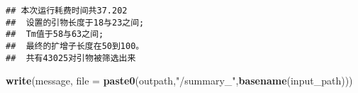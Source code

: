 \documentclass[
]{article}
\newenvironment{Shaded}{\begin{snugshade}}{\end{snugshade}}
\newcommand{\AttributeTok}[1]{\textcolor[rgb]{0.13,0.29,0.53}{#1}}
\newcommand{\FunctionTok}[1]{\textcolor[rgb]{0.13,0.29,0.53}{\textbf{#1}}}
\newcommand{\NormalTok}[1]{#1}
\newcommand{\StringTok}[1]{\textcolor[rgb]{0.31,0.60,0.02}{#1}}
\begin{document}
\begin{verbatim}
## 本次运行耗费时间共37.202
##  设置的引物长度于18与23之间;
##  Tm值于58与63之间;
##  最终的扩增子长度在50到100。
##  共有43025对引物被筛选出来
\end{verbatim}

\begin{Shaded}
\begin{Highlighting}[]
\FunctionTok{write}\NormalTok{(message, }\AttributeTok{file =} \FunctionTok{paste0}\NormalTok{(outpath,}\StringTok{"/summary\_"}\NormalTok{,}\FunctionTok{basename}\NormalTok{(input\_path)))}
\end{Highlighting}
\end{Shaded}
\end{document}

